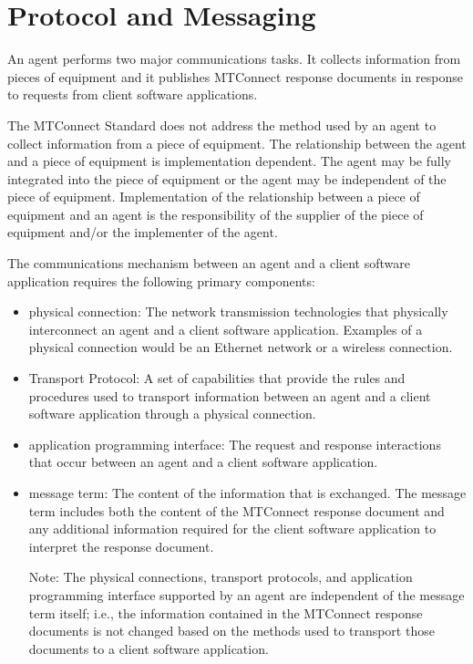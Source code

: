 \documentclass{mtconnect}	%
\begin{document}
\section{Protocol and Messaging}
\label{sec:Protocol and Messaging}

An \gls{agent} performs two \gls{major} communications tasks.  It collects information from pieces of equipment and it publishes MTConnect \glspl{response document} in response to \glspl{request} from client software applications.

The MTConnect Standard does not address the method used by an \gls{agent} to collect information from a piece of equipment.  The relationship between the \gls{agent} and a piece of equipment is implementation dependent.  The \gls{agent} may be fully integrated into the piece of equipment or the \gls{agent} may be independent of the piece of equipment.  Implementation of the relationship between a piece of equipment and an \gls{agent} is the responsibility of the supplier of the piece of equipment and/or the implementer of the \gls{agent}.

The communications mechanism between an \gls{agent} and a client software application requires the following primary components:

\begin{itemize}
\item \gls{physical connection}:  The network transmission technologies that physically interconnect an \gls{agent} and a client software application.  Examples of a \gls{physical connection} would be an Ethernet network or a wireless connection.

\item Transport Protocol:  A set of capabilities that provide the rules and procedures used to transport information between an \gls{agent} and a client software application through a \gls{physical connection}.

\item \gls{application programming interface}:  The \gls{request} and \gls{response} interactions that occur between an \gls{agent} and a client software application.

\item \gls{message term}:  The content of the information that is exchanged.  The \gls{message term} includes both the content of the MTConnect \gls{response document} and any additional information required for the client software application to interpret the \gls{response document}.

\begin{note}
Note: The \glspl{physical connection}, \glspl{transport protocol}, and \gls{application programming interface} supported by an \gls{agent} are independent of the \gls{message term} itself; i.e., the information contained in the MTConnect \glspl{response document} is not changed based on the methods used to transport those documents to a client software application.

\end{note}
\end{itemize}
\end{document}
